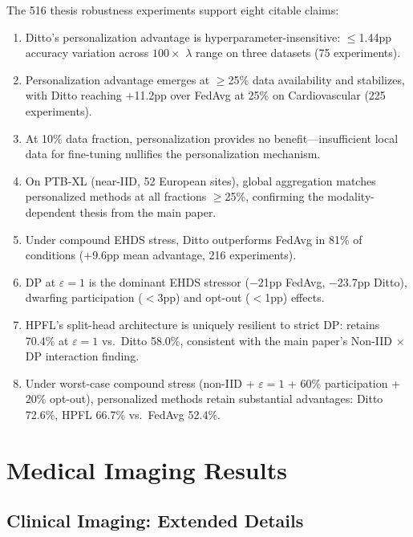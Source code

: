 \documentclass[conference]{IEEEtran}
\begin{document}
The 516 thesis robustness experiments support eight citable claims:

\begin{enumerate}
    \item Ditto's personalization advantage is hyperparameter-insensitive: $\leq$1.44pp accuracy variation across $100\times$ $\lambda$ range on three datasets (75 experiments).
    \item Personalization advantage emerges at $\geq$25\% data availability and stabilizes, with Ditto reaching $+$11.2pp over FedAvg at 25\% on Cardiovascular (225 experiments).
    \item At 10\% data fraction, personalization provides no benefit---insufficient local data for fine-tuning nullifies the personalization mechanism.
    \item On PTB-XL (near-IID, 52 European sites), global aggregation matches personalized methods at all fractions $\geq$25\%, confirming the modality-dependent thesis from the main paper.
    \item Under compound EHDS stress, Ditto outperforms FedAvg in 81\% of conditions ($+$9.6pp mean advantage, 216 experiments).
    \item DP at $\varepsilon{=}1$ is the dominant EHDS stressor ($-$21pp FedAvg, $-$23.7pp Ditto), dwarfing participation ($<$3pp) and opt-out ($<$1pp) effects.
    \item HPFL's split-head architecture is uniquely resilient to strict DP: retains 70.4\% at $\varepsilon{=}1$ vs.\ Ditto 58.0\%, consistent with the main paper's Non-IID $\times$ DP interaction finding.
    \item Under worst-case compound stress (non-IID + $\varepsilon{=}1$ + 60\% participation + 20\% opt-out), personalized methods retain substantial advantages: Ditto 72.6\%, HPFL 66.7\% vs.\ FedAvg 52.4\%.
\end{enumerate}


\section{Medical Imaging Results}
\label{app:imaging}

\subsection{Clinical Imaging: Extended Details}
\label{sec:imaging}
\end{document}
